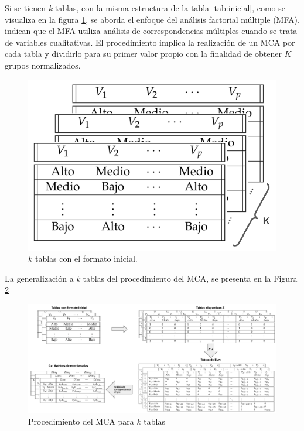\documentclass[mathematics,article,submit,moreauthors,pdftex]{mdpi}
\begin{document}
Si se tienen \emph{k} tablas, con la misma estructura de la tabla
\ref{tab:inicial}, como se visualiza en la figura \ref{fig:ktables}, se
aborda el enfoque del análisis factorial múltiple (MFA). \citet{AFM}
indican que el MFA utiliza análisis de correspondencias múltiples cuando
se trata de variables cualitativas. El procedimiento implica la
realización de un MCA por cada tabla y dividirlo para su primer valor
propio con la finalidad de obtener \(K\) grupos normalizados.

\begin{figure}[!ht]



\begin{center}\includegraphics[width=0.4\linewidth,]{ktables} \end{center}

\caption{$k$ tablas con el formato inicial.}

\label{fig:ktables}
\end{figure}

La generalización a \emph{k} tablas del procedimiento del MCA, se
presenta en la Figura \ref{fig:MCAk}

\begin{figure}[!h]


\begin{center}\includegraphics[width=0.9\linewidth,]{ktablesMCA} \end{center}

\caption{Procedimiento del MCA para $k$ tablas}

\label{fig:MCAk}
\end{figure}
\end{document}
